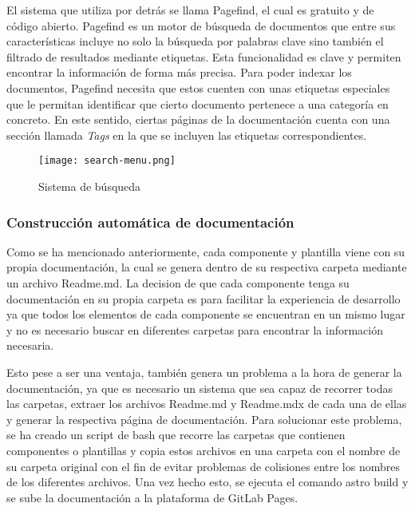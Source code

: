 El sistema que utiliza por detrás se llama Pagefind, el cual es gratuito 
y de código abierto. Pagefind es un motor de búsqueda de documentos
que entre sus características incluye no solo la búsqueda por palabras
clave sino también el filtrado de resultados mediante etiquetas. Esta 
funcionalidad es clave y permiten encontrar la información de forma más precisa. 
Para poder indexar los documentos, Pagefind necesita que estos cuenten con
unas etiquetas especiales que le permitan identificar que cierto documento
pertenece a una categoría en concreto. En este sentido, ciertas páginas
de la documentación cuenta con una sección llamada \textit{Tags} en la que
se incluyen las etiquetas correspondientes.

\begin{figure}[ht]
    \centering
    \texttt{[image: search-menu.png]}
    \caption{Sistema de búsqueda}\label{fig:search-menu}
\end{figure}

\subsubsection{Construcción automática de documentación}
Como se ha mencionado anteriormente, cada componente y plantilla 
viene con su propia documentación, la cual se genera dentro de su
respectiva carpeta mediante un archivo Readme.md. La decision de 
que cada componente tenga su documentación en su propia carpeta
es para facilitar la experiencia de desarrollo ya que todos los
elementos de cada componente se encuentran en un mismo lugar y no
es necesario buscar en diferentes carpetas para encontrar la
información necesaria.\medskip

Esto pese a ser una ventaja, también genera un problema a la hora de
generar la documentación, ya que es necesario un sistema que sea
capaz de recorrer todas las carpetas, extraer los archivos Readme.md
y Readme.mdx de cada una de ellas y generar la respectiva página
de documentación. Para solucionar este problema, se ha creado un
script de bash que recorre las carpetas que contienen componentes o
plantillas y copia estos archivos en una carpeta con el nombre de
su carpeta original con el fin de evitar problemas de colisiones
entre los nombres de los diferentes archivos. Una vez hecho esto,
se ejecuta el comando astro build y se sube la documentación a la
plataforma de GitLab Pages.


